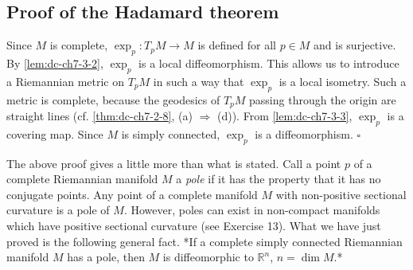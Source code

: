 \subsection{Proof of the Hadamard theorem}
Since $M$ is complete, $\exp_p:T_pM\to M$ is defined for all $p\in M$ and is
surjective. By \cref{lem:dc-ch7-3-2}, $\exp_p$ is a local diffeomorphism. This allows us to
introduce a Riemannian metric on $T_pM$ in such a way that $\exp_p$ is a local
isometry. Such a metric is complete, because the geodesics of $T_pM$ passing
through the origin are straight lines (cf. \cref{thm:dc-ch7-2-8}, (a) $\Rightarrow$ (d)).
From \cref{lem:dc-ch7-3-3}, $\exp_p$ is a covering map. Since $M$ is simply connected,
$\exp_p$ is a diffeomorphism. $\square$

\begin{remark}[poles]
  \label{rem:dc-ch7-3-4}
  The above proof gives a little more than what is stated. Call a point $p$ of a
  complete Riemannian manifold $M$ a \emph{pole} if it has the property that it has no
  conjugate points. Any point of a complete manifold $M$ with non-positive
  sectional curvature is a pole of $M$. However, poles can exist in non-compact
  manifolds which have positive sectional curvature (see Exercise 13). What we have
  just proved is the following general fact. *If a complete simply connected
  Riemannian manifold $M$ has a pole, then $M$ is diffeomorphic to $\mathbb{R}^n$,
  $n=\dim M$.*
\end{remark}
